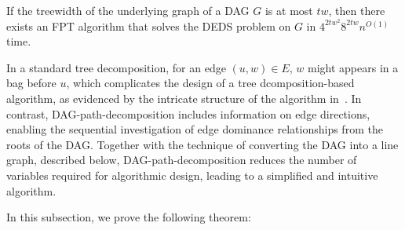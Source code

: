 \documentclass[runningheads]{llncs}
\theoremstyle{plain}
\theoremstyle{definition}
\begin{document}

\begin{proposition}
    If the treewidth of the underlying graph of a DAG \(G\) is at most \(tw\), then there exists an FPT algorithm that solves the DEDS problem on \(G\) in \(4^{2tw^2} 8^{2tw} n^{O(1)}\) time.  
\end{proposition}

In a standard tree decomposition, for an edge $(u, w) \in E$, $w$ might appears in a bag before $u$, which complicates the design of a tree dcomposition-based algorithm, as evidenced by the intricate structure of the algorithm in~\cite{art22}.
%
%
In contrast, DAG-path-decomposition includes information on edge directions, enabling the sequential investigation of edge dominance relationships from the roots of the DAG.  
Together with the technique of converting the DAG into a line graph, described below, DAG-path-decomposition reduces the number of variables required for algorithmic design, leading to a simplified and intuitive algorithm. 

In this subsection, we prove the following theorem:  
\end{document}

